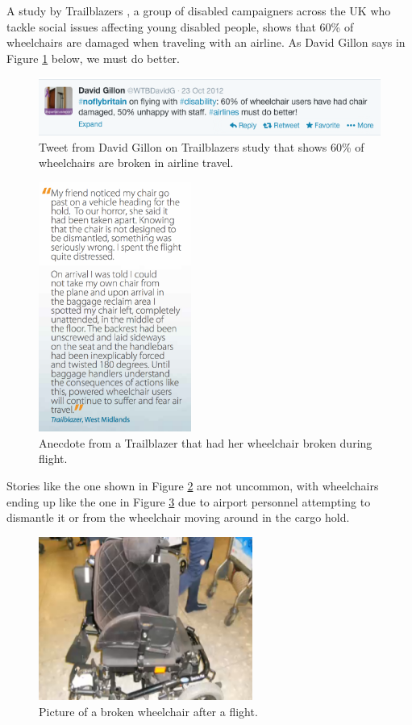 A study by Trailblazers \cite{trailblazers}, a group of disabled campaigners across the UK who tackle social issues affecting young disabled people, shows that 60\% of wheelchairs are damaged when traveling with an airline. As David Gillon says in Figure \ref{fig:60percenttweet.png} below, we must do better. 


\begin{figure}[h]
  \centering
     \includegraphics[width=12cm]{images/60percenttweet.png}
   \caption{Tweet from David Gillon on Trailblazers study that shows 60\% of wheelchairs are broken in airline travel. }
  \label{fig:60percenttweet.png}
\end{figure}

\begin{figure}[h]
  \centering
     \includegraphics[width=5cm]{images/wheelchairstory.png}
   \caption{Anecdote from a Trailblazer that had her wheelchair broken during flight. \cite{trailblazers}}
  \label{fig:wheelchairstory.png}
\end{figure}

Stories like the one shown in Figure \ref{fig:wheelchairstory.png} are not uncommon, with wheelchairs ending up like the one in Figure \ref{fig:brokenwheelchair.png} due to airport personnel attempting to dismantle it or from the wheelchair moving around in the cargo hold. 


\begin{figure}[h]
  \centering
     \includegraphics[width=7cm]{images/brokenwheelchair.png}
   \caption{Picture of a broken wheelchair after a flight. \cite{broken_wheelchair}}
  \label{fig:brokenwheelchair.png}
\end{figure}

